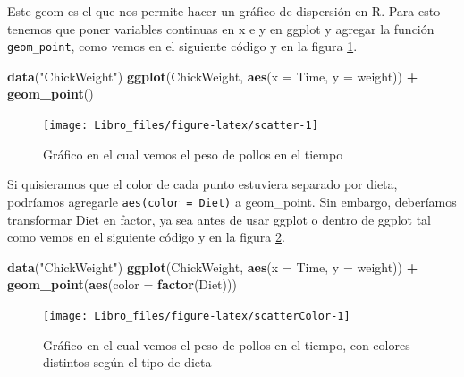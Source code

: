 \documentclass[]{book}
\newenvironment{Shaded}{\begin{snugshade}}{\end{snugshade}}
\newcommand{\DataTypeTok}[1]{\textcolor[rgb]{0.13,0.29,0.53}{#1}}
\newcommand{\KeywordTok}[1]{\textcolor[rgb]{0.13,0.29,0.53}{\textbf{#1}}}
\newcommand{\NormalTok}[1]{#1}
\newcommand{\OperatorTok}[1]{\textcolor[rgb]{0.81,0.36,0.00}{\textbf{#1}}}
\newcommand{\StringTok}[1]{\textcolor[rgb]{0.31,0.60,0.02}{#1}}
\begin{document}
Este geom es el que nos permite hacer un gráfico de dispersión en R.
Para esto tenemos que poner variables continuas en x e y en ggplot y
agregar la función \texttt{geom\_point}, como vemos en el siguiente
código y en la figura \ref{fig:scatter}.

\begin{Shaded}
\begin{Highlighting}[]
\KeywordTok{data}\NormalTok{(}\StringTok{"ChickWeight"}\NormalTok{)}
\KeywordTok{ggplot}\NormalTok{(ChickWeight, }\KeywordTok{aes}\NormalTok{(}\DataTypeTok{x =}\NormalTok{ Time, }\DataTypeTok{y =}\NormalTok{ weight)) }\OperatorTok{+}\StringTok{ }\KeywordTok{geom_point}\NormalTok{()}
\end{Highlighting}
\end{Shaded}

\begin{figure}

{\centering \texttt{[image: Libro\_files/figure-latex/scatter-1]} 

}

\caption{Gráfico en el cual vemos el peso de pollos en el tiempo}\label{fig:scatter}
\end{figure}

Si quisieramos que el color de cada punto estuviera separado por dieta,
podríamos agregarle \texttt{aes(color\ =\ Diet)} a geom\_point. Sin
embargo, deberíamos transformar Diet en factor, ya sea antes de usar
ggplot o dentro de ggplot tal como vemos en el siguiente código y en la
figura \ref{fig:scatterColor}.

\begin{Shaded}
\begin{Highlighting}[]
\KeywordTok{data}\NormalTok{(}\StringTok{"ChickWeight"}\NormalTok{)}
\KeywordTok{ggplot}\NormalTok{(ChickWeight, }\KeywordTok{aes}\NormalTok{(}\DataTypeTok{x =}\NormalTok{ Time, }\DataTypeTok{y =}\NormalTok{ weight)) }\OperatorTok{+}\StringTok{ }\KeywordTok{geom_point}\NormalTok{(}\KeywordTok{aes}\NormalTok{(}\DataTypeTok{color =} \KeywordTok{factor}\NormalTok{(Diet)))}
\end{Highlighting}
\end{Shaded}

\begin{figure}

{\centering \texttt{[image: Libro\_files/figure-latex/scatterColor-1]} 

}

\caption{Gráfico en el cual vemos el peso de pollos en el tiempo, con colores distintos según el tipo de dieta}\label{fig:scatterColor}
\end{figure}
\end{document}
